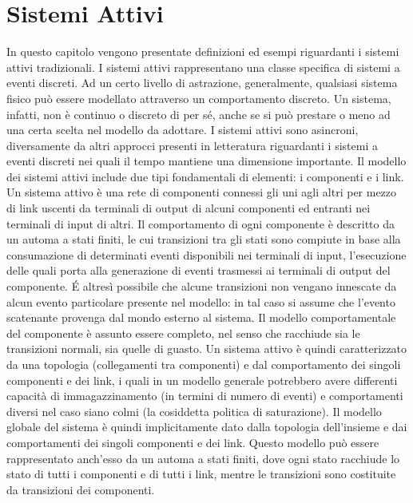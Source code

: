 \chapter{Sistemi Attivi}
In questo capitolo vengono presentate definizioni ed esempi riguardanti i sistemi attivi tradizionali.
I sistemi attivi rappresentano una classe specifica di sistemi a eventi discreti. Ad un certo livello di astrazione, generalmente, qualsiasi sistema fisico può essere modellato attraverso un comportamento discreto. Un sistema, infatti, non è continuo o discreto di per sé, anche se si può prestare o meno ad una certa scelta nel modello da adottare. I sistemi attivi sono asincroni, diversamente da altri approcci presenti in letteratura riguardanti i sistemi a eventi discreti nei quali il tempo mantiene una dimensione importante.
Il modello dei sistemi attivi include due tipi fondamentali di elementi: i componenti e i link. Un sistema attivo è una rete di componenti connessi gli uni agli altri per mezzo di link uscenti da terminali di output di alcuni componenti ed entranti nei terminali di input di altri. Il comportamento di ogni componente è descritto da un automa a stati finiti, le cui transizioni tra gli stati sono compiute in base alla consumazione di determinati eventi disponibili nei terminali di input, l'esecuzione delle quali porta alla generazione di eventi trasmessi ai terminali di output del componente. \'E altresì possibile che alcune transizioni non vengano innescate da alcun evento particolare presente nel modello: in tal caso si assume che l'evento scatenante provenga dal mondo esterno al sistema. Il modello comportamentale del componente è assunto essere completo, nel senso che racchiude sia le transizioni normali, sia quelle di guasto.
Un sistema attivo è quindi caratterizzato da una topologia (collegamenti tra componenti) e dal comportamento dei singoli componenti e dei link, i quali in un modello generale potrebbero avere differenti capacità di immagazzinamento (in termini di numero di eventi) e comportamenti diversi nel caso siano colmi (la cosiddetta politica di saturazione).
Il modello globale del sistema è quindi implicitamente dato dalla topologia dell'insieme e dai comportamenti dei singoli componenti e dei link. Questo modello può essere rappresentato anch'esso da un automa a stati finiti, dove ogni stato racchiude lo stato di tutti i componenti e di tutti i link, mentre le transizioni sono costituite da transizioni dei componenti.

